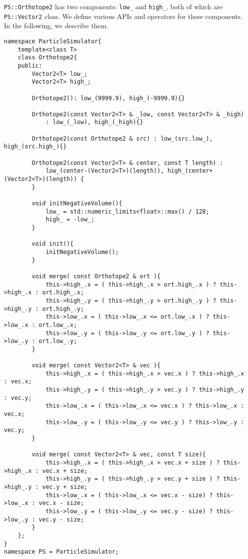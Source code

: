 \texttt{PS::Orthotope2} has two components: \texttt{low\_} and \texttt{high\_}, both of which are \texttt{PS::Vector2} class.
We define various APIs and operators for these components.
In the following, we describe them.

\begin{lstlisting}[caption=Orthotope2]
namespace ParticleSimulator{
    template<class T>
    class Orthotope2{
    public:
        Vector2<T> low_;
        Vector2<T> high_;

        Orthotope2(): low_(9999.9), high_(-9999.9){}
        
        Orthotope2(const Vector2<T> & _low, const Vector2<T> & _high)
            : low_(_low), high_(_high){}
        
        Orthotope2(const Orthotope2 & src) : low_(src.low_), high_(src.high_){}

        Orthotope2(const Vector2<T> & center, const T length) :
            low_(center-(Vector2<T>)(length)), high_(center+(Vector2<T>)(length)) {
        }

        void initNegativeVolume(){
            low_ = std::numeric_limits<float>::max() / 128;
            high_ = -low_;
        }

        void init(){
            initNegativeVolume();
        }

        void merge( const Orthotope2 & ort ){
            this->high_.x = ( this->high_.x > ort.high_.x ) ? this->high_.x : ort.high_.x;
            this->high_.y = ( this->high_.y > ort.high_.y ) ? this->high_.y : ort.high_.y;
            this->low_.x = ( this->low_.x <= ort.low_.x ) ? this->low_.x : ort.low_.x;
            this->low_.y = ( this->low_.y <= ort.low_.y ) ? this->low_.y : ort.low_.y;
        }

        void merge( const Vector2<T> & vec ){
            this->high_.x = ( this->high_.x > vec.x ) ? this->high_.x : vec.x;
            this->high_.y = ( this->high_.y > vec.y ) ? this->high_.y : vec.y;
            this->low_.x = ( this->low_.x <= vec.x ) ? this->low_.x : vec.x;
            this->low_.y = ( this->low_.y <= vec.y ) ? this->low_.y : vec.y;
        }

        void merge( const Vector2<T> & vec, const T size){
            this->high_.x = ( this->high_.x > vec.x + size ) ? this->high_.x : vec.x + size;
            this->high_.y = ( this->high_.y > vec.y + size ) ? this->high_.y : vec.y + size;
            this->low_.x = ( this->low_.x <= vec.x - size) ? this->low_.x : vec.x - size;
            this->low_.y = ( this->low_.y <= vec.y - size) ? this->low_.y : vec.y - size;
        }
    };
}
namespace PS = ParticleSimulator;
\end{lstlisting}


